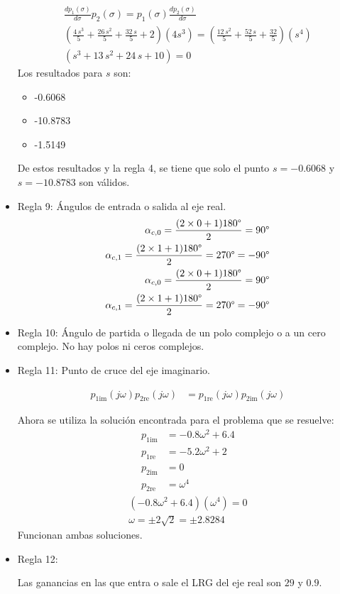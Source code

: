 \begin{itemize}
  \begin{align*}
    \frac{dp_1(\sigma)}{d\sigma} p_2(\sigma) = p_1(\sigma) \frac{dp_2(\sigma)}{d\sigma}
    \\
    (\frac{4\,s^3}{5}+\frac{26\,s^2}{5}+\frac{32\,s}{5}+2)(4s^3) = (\frac{12\,s^2}{5}+\frac{52\,s}{5}+\frac{32}{5})(s^4)
    \\
    \left(s^3+13\,s^2+24\,s+10\right) = 0
  \end{align*}
  Los resultados para $s$ son:
  \begin{itemize}
    \item -0.6068
    \item -10.8783
    \item -1.5149
  \end{itemize}
  De estos resultados y la regla 4, se tiene que solo el punto $s=-0.6068$ y $s=-10.8783$ son válidos.
  \item Regla 9: Ángulos de entrada o salida al eje real.
  \begin{align*}
    \alpha_{c,0} = \frac{(2\times0+1)180\degree}{2} = 90\degree
    \\
    \alpha_{c,1} = \frac{(2\times1+1)180\degree}{2} = 270\degree = -90\degree
    \\
    \alpha_{c,0} = \frac{(2\times0+1)180\degree}{2} = 90\degree
    \\
    \alpha_{c,1} = \frac{(2\times1+1)180\degree}{2} = 270\degree = -90\degree
  \end{align*}
  \item Regla 10: Ángulo de partida o llegada de un polo complejo o a un cero complejo.
  No hay polos ni ceros complejos.

  \item Regla 11: Punto de cruce del eje imaginario.

  \begin{align*}
    p_{1\text{im}}(j\omega) p_{2\text{re}}(j\omega) &=  p_{1\text{re}}(j\omega) p_{2\text{im}}(j\omega)
  \end{align*}

  Ahora se utiliza la solución encontrada para el problema que se resuelve:
  \begin{align*}
    p_{1\text{im}} &=-0.8\omega^2+6.4
    \\
    p_{1\text{re}} &=-5.2\omega^2+2
    \\
    p_{2\text{im}} &=0
    \\
    p_{2\text{re}} &=\omega^4
  \end{align*}
  \begin{align*}
    (-0.8\omega^2+6.4)(\omega^4) = 0
    \\
    \omega = \pm 2\sqrt{2} =\pm2.8284
  \end{align*}
  Funcionan ambas soluciones.

   \item Regla 12:

  Las ganancias en las que entra o sale el LRG del eje real son $29$ y $0.9$.

\end{itemize}
